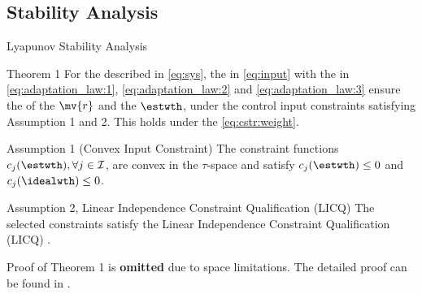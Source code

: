 \documentclass[8pt, aspectratio=169, handout]{beamer}
\newcommand{\ctxt}[2]{\color{#1}{#2}\color{black}}
\begin{document}
\subsection{Stability Analysis}

\begin{frame}{\insertsubsectionhead}{Lyapunov Stability Analysis}

  \centering
  \begin{minipage}{.9\textwidth}

    \begin{block}{Theorem 1 \cite{Ryu:2025aa}}
      For the \ctxt{airforceblue}{dynamical system } described in \eqref{eq:sys}, the \ctxt{awesome}{neuro-adaptive controller } in \eqref{eq:input} with the \ctxt{airforceblue}{weight adaptation laws } in \eqref{eq:adaptation_law:1}, \eqref{eq:adaptation_law:2} and \eqref{eq:adaptation_law:3} ensure the \ctxt{airforceblue}{boundedness } of the \ctxt{awesome}{filtered error } $\mv{r}$ and the \ctxt{awesome}{weight estimate } $\estwth$, under the control input constraints satisfying Assumption 1 and 2. This holds under the \ctxt{awesome}{weight norm constraint } \eqref{eq:cstr:weight}.
    \end{block}

    \begin{exampleblock}{Assumption 1 (Convex Input Constraint)}
      The constraint functions $c_j(\estwth),\forall j\in\mathcal{I}$, are convex in the $\tau$-space and satisfy $c_j(\estwth)\le0$ and $c_j(\idealwth)\le0$.
    \end{exampleblock}

    \begin{exampleblock}{Assumption 2, Linear Independence Constraint Qualification (LICQ)}
      The selected constraints satisfy the Linear Independence Constraint Qualification (LICQ) \cite[Chap. 12 Def. 12.1]{Nocedal:2006aa}.
    \end{exampleblock}

  \end{minipage}

  \vspace{.2cm}

  Proof of Theorem 1 is \textbf{omitted } due to space limitations. The detailed proof can be found in \cite{Ryu:2025aa}.

\end{frame}
\end{document}
